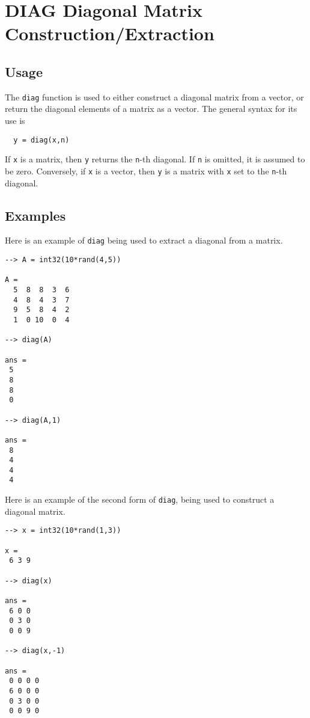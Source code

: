 \section{DIAG Diagonal Matrix Construction/Extraction}

\subsection{Usage}

The \verb|diag| function is used to either construct a 
diagonal matrix from a vector, or return the diagonal
elements of a matrix as a vector.  The general syntax
for its use is
\begin{verbatim}
  y = diag(x,n)
\end{verbatim}
If \verb|x| is a matrix, then \verb|y| returns the \verb|n|-th 
diagonal.  If \verb|n| is omitted, it is assumed to be
zero.  Conversely, if \verb|x| is a vector, then \verb|y|
is a matrix with \verb|x| set to the \verb|n|-th diagonal.
\subsection{Examples}

Here is an example of \verb|diag| being used to extract
a diagonal from a matrix.
\begin{verbatim}
--> A = int32(10*rand(4,5))

A = 
  5  8  8  3  6 
  4  8  4  3  7 
  9  5  8  4  2 
  1  0 10  0  4 

--> diag(A)

ans = 
 5 
 8 
 8 
 0 

--> diag(A,1)

ans = 
 8 
 4 
 4 
 4 
\end{verbatim}
Here is an example of the second form of \verb|diag|, being
used to construct a diagonal matrix.
\begin{verbatim}
--> x = int32(10*rand(1,3))

x = 
 6 3 9 

--> diag(x)

ans = 
 6 0 0 
 0 3 0 
 0 0 9 

--> diag(x,-1)

ans = 
 0 0 0 0 
 6 0 0 0 
 0 3 0 0 
 0 0 9 0 
\end{verbatim}
